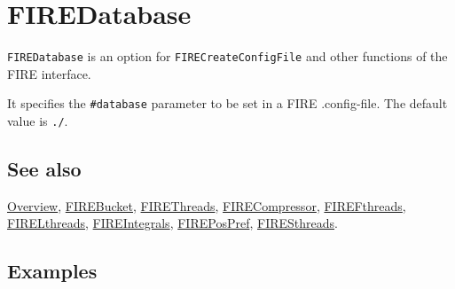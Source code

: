 \documentclass[../FeynHelpersManual.tex]{subfiles}
\begin{document}
\begin{Shaded}
\begin{Highlighting}[]
 
\end{Highlighting}
\end{Shaded}

\hypertarget{firedatabase}{
\section{FIREDatabase}\label{firedatabase}}

\texttt{FIREDatabase} is an option for \texttt{FIRECreateConfigFile} and
other functions of the FIRE interface.

It specifies the \texttt{\#{}\allowbreak{}database} parameter to be set
in a FIRE .config-file. The default value is \texttt{./}.

\subsection{See also}

\hyperlink{toc}{Overview}, \hyperlink{firebucket}{FIREBucket},
\hyperlink{firethreads}{FIREThreads},
\hyperlink{firecompressor}{FIRECompressor},
\hyperlink{firefthreads}{FIREFthreads},
\hyperlink{firelthreads}{FIRELthreads},
\hyperlink{fireintegrals}{FIREIntegrals},
\hyperlink{firepospref}{FIREPosPref},
\hyperlink{firesthreads}{FIRESthreads}.

\subsection{Examples}
\end{document}
